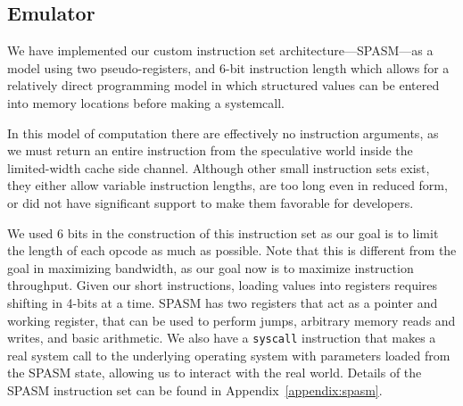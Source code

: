 \FigSpecBandwidth

\subsection{Emulator}
\label{subsec:spasm}


We have implemented our custom instruction set architecture---SPASM---as a model
using two pseudo-registers, and 6-bit instruction length which allows for a
relatively direct programming model in which structured values can be entered
into memory locations before making a systemcall.


%

In this model of computation there are effectively no instruction arguments, as
we must return an entire instruction from the speculative world inside the
limited-width cache side channel. Although other small instruction sets exist,
they either allow variable instruction lengths, are too long even in reduced
form, or did not have significant support to make them favorable for developers.

We used 6 bits in the construction of this instruction set as our goal is to
limit the length of each opcode as much as possible. Note that this is different
from the goal in maximizing bandwidth, as our goal now is to maximize
instruction throughput. Given our short instructions, loading values into
registers requires shifting in 4-bits at a time. SPASM has two registers that
act as a pointer and working register, that can be used to perform jumps,
arbitrary memory reads and writes, and basic arithmetic. We also have a
\texttt{syscall} instruction that makes a real system call to the underlying
operating system with parameters loaded from the SPASM state, allowing us to
interact with the real world. Details of the SPASM instruction set can be found
in Appendix~\ref{appendix:spasm}. 

